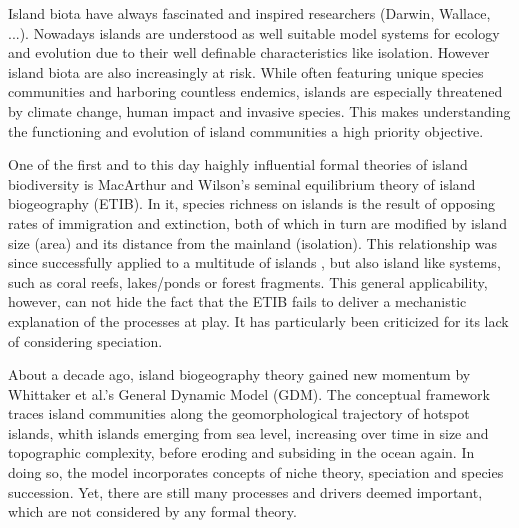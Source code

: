 \documentclass[a4paper]{scrartcl}
\begin{document}



Island biota have always fascinated and inspired researchers (Darwin, Wallace, ...). %
Nowadays islands are understood as well suitable model systems for ecology and evolution due to their well definable characteristics like isolation. %
However island biota are also increasingly at risk.
While often featuring unique species communities and harboring countless endemics, %
islands are especially threatened by climate change, human impact and invasive species. %
This makes understanding the functioning and evolution of island communities a high priority objective.

One of the first and to this day haighly influential formal theories of island biodiversity is MacArthur and Wilson's seminal equilibrium theory of island biogeography (ETIB). %
In it, species richness on islands is the result of opposing rates of immigration and extinction, both of which in turn are modified by island size (area) and its distance from the mainland (isolation).
This relationship was since successfully applied to a multitude of islands %
, but also island like systems, such as coral reefs, lakes/ponds or forest fragments. %
This general applicability, however, can not hide the fact that the ETIB fails to deliver a mechanistic explanation of the processes at play.
It has particularly been criticized for its lack of considering speciation. %

About a decade ago, island biogeography theory gained new momentum by Whittaker et al.'s General Dynamic Model (GDM). %
The conceptual framework traces island communities along the geomorphological trajectory of hotspot islands,
whith islands emerging from sea level, increasing over time in size and topographic complexity, before eroding and subsiding in the ocean again.
In doing so, the model incorporates concepts of niche theory, speciation and species succession.
Yet, there are still many processes and drivers deemed important, which are not considered by any formal theory.
\end{document}
